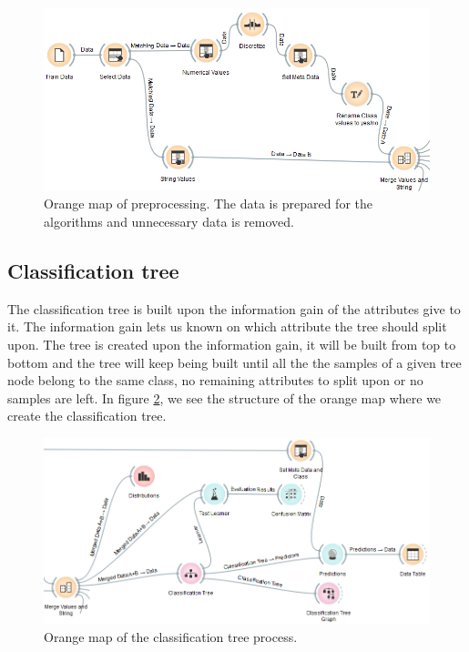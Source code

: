 \documentclass[a4paper,11pt]{article}
\begin{document}
\begin{figure}
	\begin{center}
	\includegraphics[scale=0.7]{PreprocessMap}
	\end{center}
	\caption{Orange map of preprocessing. The data is prepared for the algorithms and unnecessary data is removed.}
	\label{preprocessMap}
\end{figure}

\subsection{Classification tree}
The classification tree\cite{ClassificationTree} is built upon the information gain of the attributes give to it. The information gain lets us known on which attribute the tree should split upon.
The tree is created upon the information gain, it will be built from top to bottom and the tree will keep being built until all the the samples of a given tree node belong to the same class, no remaining attributes to split upon or no samples are left. In figure \ref{classTreeMap}, we see the structure of the orange map where we create the classification tree. 
\begin{figure}
\begin{center}
\includegraphics[scale=0.5]{ClassificationTreeOrange}
\end{center}
\caption{Orange map of the classification tree process.}
\label{classTreeMap}
\end{figure}
\end{document}
